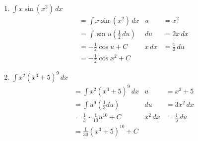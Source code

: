 \documentclass[12pt]{article}
\newcommand{\point}{\,\cdot\,}
\newcommand{\mins}{-}
\newcommand{\inline}[1]{\({#1}\)}
\begin{document}
        \begin{enumerate}

            \item \inline{\int{} x \sin{(x^2)} \, dx}
            \begin{align*}
                &= \int{} x \sin{(x^2)} \, dx               & u &= x^2 \\
                &= \int{} \sin{u} (\frac{1}{2} \, du)       & du &= 2x \, dx \\
                &= \mins{} \frac{1}{2} \cos{u} + C          & x \, dx &= \frac{1}{2} \, du \\
                &= \mins{} \frac{1}{2} \cos{x^2} + C
            \end{align*}

            \item \inline{\int{} x^2 {(x^3 + 5)}^9 \, dx}
            \begin{align*}
                &= \int{} x^2 {(x^3 + 5)}^9 \, dx                   & u &= x^3 + 5 \\
                &= \int{} u^9 (\frac{1}{3} du)                      & du &= 3x^2 \, dx \\
                &= \frac{1}{3} \point{} \frac{1}{10} u^{10} + C     & x^2 \, dx &= \frac{1}{3} \, du \\
                &= \frac{1}{30} {(x^3 + 5)}^{10} + C
            \end{align*}


\end{enumerate}
\end{document}
